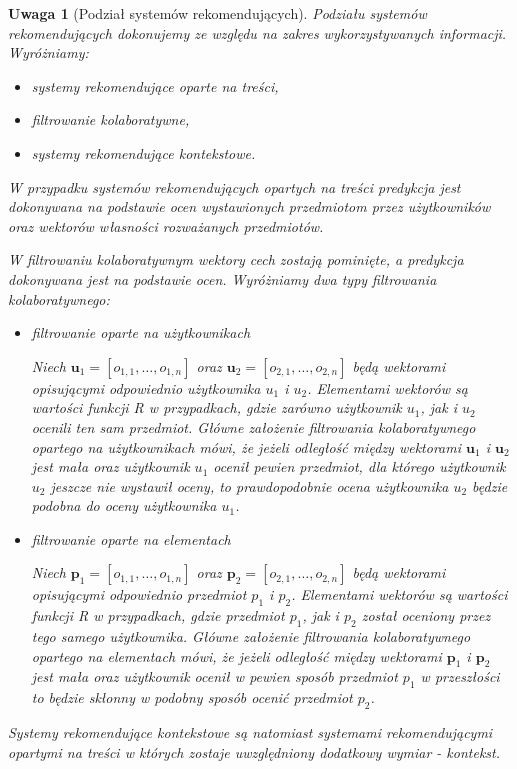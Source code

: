 \documentclass[12pt,a4paper]{report}
\newtheorem{uwaga}[df]{Uwaga}
\begin{document}
\begin{uwaga}[Podział systemów rekomendujących]
Podziału systemów rekomendujących dokonujemy ze względu na zakres wykorzystywanych informacji. Wyróżniamy:
\begin{itemize}
\item systemy rekomendujące oparte na treści,
\item filtrowanie kolaboratywne,
\item systemy rekomendujące kontekstowe.
\end{itemize}

W przypadku systemów rekomendujących opartych na treści predykcja jest dokonywana na podstawie ocen wystawionych przedmiotom przez użytkowników oraz wektorów własności rozważanych przedmiotów. 

W filtrowaniu kolaboratywnym wektory cech zostają pominięte, a predykcja dokonywana jest na podstawie ocen. Wyróżniamy dwa typy filtrowania kolaboratywnego:
\begin{itemize}
\item filtrowanie oparte na użytkownikach

Niech $\mathbf{u}_1 = [o_{1,1}, \ldots, o_{1,n}]$ oraz $\mathbf{u}_2 = [o_{2,1}, \ldots, o_{2,n}]$ będą wektorami opisującymi odpowiednio użytkownika $u_1$ i $u_2$. Elementami wektorów są wartości funkcji R w przypadkach, gdzie zarówno użytkownik $u_1$, jak i $u_2$ ocenili ten sam przedmiot. Główne założenie filtrowania kolaboratywnego opartego na użytkownikach mówi, że jeżeli odległość między wektorami $\mathbf{u}_1$ i $\mathbf{u}_2$ jest mała oraz użytkownik $u_1$ ocenił pewien przedmiot, dla którego użytkownik $u_2$ jeszcze nie wystawił oceny, to prawdopodobnie ocena użytkownika $u_2$ będzie podobna do oceny użytkownika $u_1$.
\item filtrowanie oparte na elementach

Niech $\mathbf{p}_1 = [o_{1,1}, \ldots, o_{1,n}]$ oraz $\mathbf{p}_2 = [o_{2,1}, \ldots, o_{2,n}]$ będą wektorami opisującymi odpowiednio przedmiot $p_1$ i $p_2$. Elementami wektorów są wartości funkcji R w przypadkach, gdzie przedmiot $p_1$, jak i $p_2$ został oceniony przez tego samego użytkownika. Główne założenie filtrowania kolaboratywnego opartego na elementach mówi, że jeżeli odległość między wektorami $\mathbf{p}_1$ i $\mathbf{p}_2$ jest mała oraz użytkownik ocenił w pewien sposób przedmiot $p_1$ w przeszłości to będzie skłonny w podobny sposób ocenić przedmiot $p_2$.
\end{itemize}

Systemy rekomendujące kontekstowe są natomiast systemami rekomendującymi opartymi na treści w których zostaje uwzględniony dodatkowy wymiar - kontekst.
\end{uwaga}
\end{document}
